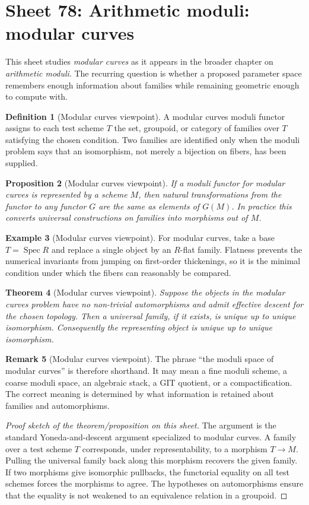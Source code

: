 \documentclass[11pt]{amsart}
\newtheorem{theorem}{Theorem}[section]
\newtheorem{proposition}[theorem]{Proposition}
\theoremstyle{definition}
\newtheorem{definition}[theorem]{Definition}
\newtheorem{example}[theorem]{Example}
\newtheorem{remark}[theorem]{Remark}
\newcommand{\Spec}{\operatorname{Spec}}
\begin{document}
\section{Sheet 78: Arithmetic moduli: modular curves}
This sheet studies \emph{modular curves} as it appears in the broader chapter on \emph{arithmetic moduli}.  The recurring question is whether a proposed parameter space remembers enough information about families while remaining geometric enough to compute with.
\begin{definition}[Modular curves viewpoint]
A modular curves moduli functor assigns to each test scheme $T$ the set, groupoid, or category of families over $T$ satisfying the chosen condition.  Two families are identified only when the moduli problem says that an isomorphism, not merely a bijection on fibers, has been supplied.
\end{definition}
\begin{proposition}[Modular curves viewpoint]
If a moduli functor for modular curves is represented by a scheme $M$, then natural transformations from the functor to any functor $G$ are the same as elements of $G(M)$.  In practice this converts universal constructions on families into morphisms out of $M$.
\end{proposition}
\begin{example}[Modular curves viewpoint]
For modular curves, take a base $T=\Spec R$ and replace a single object by an $R$-flat family.  Flatness prevents the numerical invariants from jumping on first-order thickenings, so it is the minimal condition under which the fibers can reasonably be compared.
\end{example}
\begin{theorem}[Modular curves viewpoint]
Suppose the objects in the modular curves problem have no non-trivial automorphisms and admit effective descent for the chosen topology.  Then a universal family, if it exists, is unique up to unique isomorphism.  Consequently the representing object is unique up to unique isomorphism.
\end{theorem}
\begin{remark}[Modular curves viewpoint]
The phrase ``the moduli space of modular curves'' is therefore shorthand.  It may mean a fine moduli scheme, a coarse moduli space, an algebraic stack, a GIT quotient, or a compactification.  The correct meaning is determined by what information is retained about families and automorphisms.
\end{remark}
\begin{proof}[Proof sketch of the theorem/proposition on this sheet]
The argument is the standard Yoneda-and-descent argument specialized to modular curves.  A family over a test scheme $T$ corresponds, under representability, to a morphism $T\to M$.  Pulling the universal family back along this morphism recovers the given family.  If two morphisms give isomorphic pullbacks, the functorial equality on all test schemes forces the morphisms to agree.  The hypotheses on automorphisms ensure that the equality is not weakened to an equivalence relation in a groupoid.
\end{proof}
\end{document}
